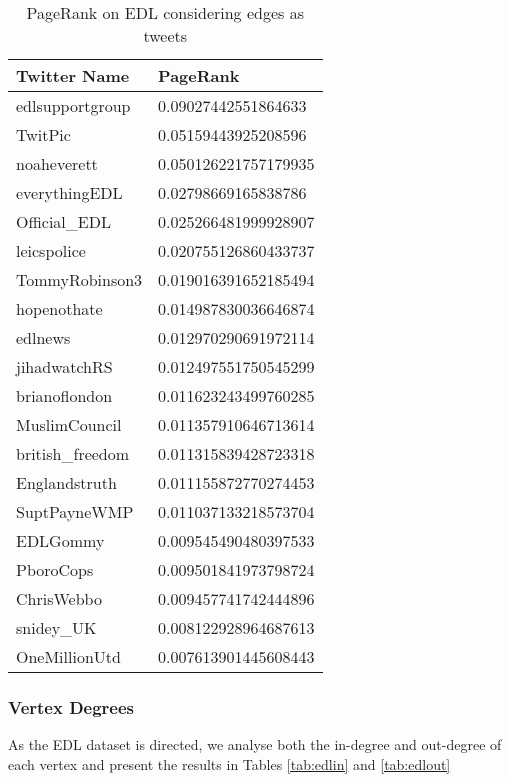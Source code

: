\begin{table}[htbp]%
\centering
\begin{tabular}{|l|l|}
\hline
Twitter Name & PageRank \\
\hline
edlsupportgroup & 0.09027442551864633 \\
TwitPic & 0.05159443925208596 \\
noaheverett & 0.050126221757179935 \\
everythingEDL & 0.02798669165838786 \\
Official\_EDL & 0.025266481999928907 \\
leicspolice & 0.020755126860433737 \\
TommyRobinson3 & 0.019016391652185494 \\
hopenothate & 0.014987830036646874 \\
edlnews & 0.012970290691972114 \\
jihadwatchRS & 0.012497551750545299 \\
brianoflondon & 0.011623243499760285 \\
MuslimCouncil & 0.011357910646713614 \\
british\_freedom & 0.011315839428723318 \\
Englandstruth & 0.011155872770274453 \\
SuptPayneWMP & 0.011037133218573704 \\
EDLGommy & 0.009545490480397533 \\
PboroCops & 0.009501841973798724 \\
ChrisWebbo & 0.009457741742444896 \\
snidey\_UK & 0.008122928964687613 \\
OneMillionUtd & 0.007613901445608443 \\
\hline
\end{tabular}
\caption{PageRank on EDL considering edges as tweets}
\label{tab:edltweetpagerank}
\end{table}

\subsubsection{Vertex Degrees}
As the EDL dataset is directed, we analyse both the in-degree and out-degree of each vertex and present the results in Tables \ref{tab:edlin} and \ref{tab:edlout}

